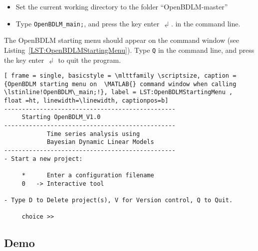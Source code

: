 \begin{itemize}
\item Set the current working directory to the folder ``OpenBDLM-master''
\item Type \colorbox{light-gray}{\lstinline[basicstyle = \mlttfamily \small, backgroundcolor = \color{light-gray}]!OpenBDLM_main;!}, and press the key enter $\dlsh$.
in the \MATLAB{} command line.
\end{itemize}
The OpenBDLM starting menu should appear on the \MATLAB{} command window (see Listing~\ref{LST:OpenBDLMStartingMenu}).
Type \colorbox{light-gray}{\lstinline[basicstyle = \mlttfamily \small, backgroundcolor = \color{light-gray}]!Q!} in the command line, and press the key enter $\dlsh$ to quit the program.
\begin{lstlisting}[ frame = single, basicstyle = \mlttfamily \scriptsize, caption = {OpenBDLM starting menu on  \MATLAB{} command window when calling \lstinline!OpenBDLM\_main;!}, label = LST:OpenBDLMStartingMenu ,  float =ht, linewidth=\linewidth, captionpos=b]
------------------------------------------------
     Starting OpenBDLM_V1.0
------------------------------------------------
            Time series analysis using 
            Bayesian Dynamic Linear Models
------------------------------------------------
- Start a new project: 

     *      Enter a configuration filename 
     0   -> Interactive tool 

- Type D to Delete project(s), V for Version control, Q to Quit.

     choice >>
\end{lstlisting}


\subsection{Demo}

